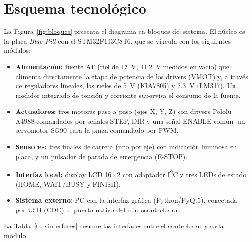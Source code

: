 \section{Esquema tecnológico}\label{sec:esquema}

La Figura~\ref{fig:bloques} presenta el diagrama en bloques del sistema. El núcleo es la
placa \emph{Blue Pill} con el STM32F103C8T6, que se vincula con los siguientes módulos:

\begin{itemize}
  \item \textbf{Alimentación:} fuente AT (riel de \SI{12}{\volt}, \SI{11,2}{\volt} medidos en
        vacío) que alimenta directamente la etapa de potencia de los drivers (VMOT) y, a
        través de reguladores lineales, los rieles de \SI{5}{\volt} (KIA7805) y
        \SI{3,3}{\volt} (LM317). Un medidor integrado de tensión y corriente supervisa el
        consumo de la fuente.
  \item \textbf{Actuadores:} tres motores paso a paso (ejes X, Y, Z) con drivers Pololu A4988
        comandados por señales STEP, DIR y una señal ENABLE común; un servomotor SG90 para la
        pinza comandado por PWM.
  \item \textbf{Sensores:} tres finales de carrera (uno por eje) con indicación luminosa en
        placa, y un pulsador de parada de emergencia (E-STOP).
  \item \textbf{Interfaz local:} display LCD 16$\times$2 con adaptador I\textsuperscript{2}C y
        tres LEDs de estado (HOME, WAIT/BUSY y FINISH).
  \item \textbf{Sistema externo:} PC con la interfaz gráfica \tails{} (Python/PyQt5),
        conectada por USB (CDC) al puerto nativo del microcontrolador.
\end{itemize}


La Tabla~\ref{tab:interfaces} resume las interfaces entre el controlador y cada módulo.

